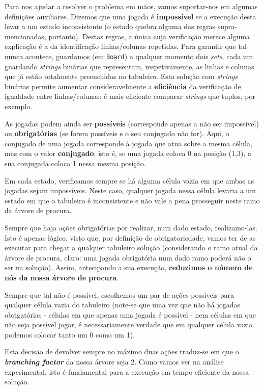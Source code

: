 \documentclass[12pt,a4paper]{article}
\begin{document}
Para nos ajudar a resolver o problema em mãos, vamos suportar-nos em algumas definições auxiliares.
Dizemos que uma jogada é \textbf{impossível} se a execução desta levar a um estado
inconsistente (o estado quebra alguma das regras supra-mencionadas, portanto).
Destas regras, a única cuja verificação merece alguma explicação é a da identificação
linhas/colunas repetidas.
Para garantir que tal nunca acontece, guardamos (em \texttt{Board}) a qualquer momento
dois \textit{sets}, cada um guardando \textit{strings} binárias que representam,
respetivamente, as linhas e colunas que já estão totalmente preenchidas no tabuleiro.
Esta solução com \textit{strings} binárias permite aumentar consideravelmente a
\textbf{eficiência} da verificação de igualdade entre linhas/colunas: é mais eficiente
comparar \textit{strings} que tuplos, por exemplo.

As jogadas podem ainda ser \textbf{possíveis} (corresponde apenas a não ser impossível)
ou \textbf{obrigatórias} (se forem possíveis e o seu conjugado não for).
Aqui, o conjugado de uma jogada corresponde à jogada que atua sobre a mesma célula,
mas com o valor \textbf{conjugado}: isto é, se uma jogada coloca 0 na posição (1,3),
a sua conjugada coloca 1 nessa mesma posição.

Em cada estado, verificamos sempre se há alguma célula vazia em que ambas as jogadas
sejam impossíveis.
Neste caso, qualquer jogada nessa célula levaria a um estado em que o tabuleiro é
inconsistente e não vale a pena prosseguir neste ramo da árvore de procura.

Sempre que haja ações obrigatórias por realizar, num dado estado, realizamo-las.
Isto é apenas lógico, visto que, por definição de obrigatoriedade, vamos ter de
as executar para chegar a qualquer tabuleiro solução (considerando o ramo
atual da árvore de procura, claro: uma jogada obrigatória num dado ramo poderá
não o ser na solução).
Assim, antecipando a sua execução, \textbf{reduzimos o número de nós da nossa árvore de procura}.

Sempre que tal não é possível, escolhemos um par de ações possíveis para qualquer
célula vazia do tabuleiro (note-se que uma vez que não há jogadas obrigatórias -
células em que apenas uma jogada é possível - nem células em que não seja possível jogar,
é necessariamente verdade que em qualquer célula vazia podemos colocar tanto um 0 como um 1).

Esta decisão de devolver sempre no máximo duas ações traduz-se em que o \textbf{\textit{branching factor}}
da nossa árvore seja 2.
Como vamos ver na análise experimental, isto é fundamental para a execução em tempo
eficiente da nossa solução.
\end{document}

